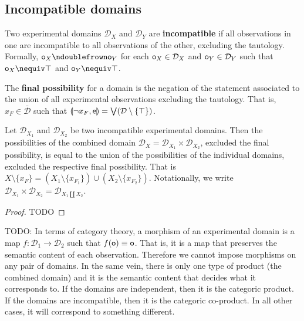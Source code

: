 \documentclass[11pt,letterpaper,fleqn]{memoir} %
\begin{document}
\subsection{Incompatible domains}

\begin{mathSection}
	\begin{defn}
		Two experimental domains $\mathcal{D}_X$ and $\mathcal{D}_Y$ are \textbf{incompatible} if all observations in one are incompatible to all observations of the other, excluding the tautology. Formally, $\obs_X \ncomp \obs_Y$ for each $\mathsf{o}_X \in \mathcal{D}_X$ and $\mathsf{o}_Y \in \mathcal{D}_Y$ such that $\obs_X \nequiv \tautology $ and $\obs_Y \nequiv \tautology$.
	\end{defn}
	\begin{defn}
		The \textbf{final possibility} for a domain is the negation of the statement associated to the union of all experimental observations excluding the tautology. That is, $x_F \in \bar{\mathcal{D}}$ such that $\llparenthesis \neg x_F, \mathsf{e} \rrparenthesis = \bigvee ( \mathcal{D} \setminus \{\top\})$.
	\end{defn}
	\begin{prop}
		Let $\mathcal{D}_{X_1}$ and $\mathcal{D}_{X_2}$ be two incompatible experimental domains. Then the possibilities of the combined domain $\mathcal{D}_X = \mathcal{D}_{X_1} \times \mathcal{D}_{X_2}$, excluded the final possibility, is equal to the union of the possibilities of the individual domains, excluded the respective final possibility. That is $X \setminus \{x_F\} = (X_1 \setminus \{x_{F_1}\}) \cup (X_2 \setminus \{x_{F_2}\})$. Notationally, we write $\mathcal{D}_{X_1} \times \mathcal{D}_{X_2} = \mathcal{D}_{X_1 \coprod X_2}$.
	\end{prop}
	\begin{proof}
		TODO
	\end{proof}
\end{mathSection}

TODO: In terms of category theory, a morphism of an experimental domain is a map $f : \mathcal{D}_1 \to \mathcal{D}_2$ such that $f(\mathsf{o}) \equiv \mathsf{o}$. That is, it is a map that preserves the semantic content of each observation. Therefore we cannot impose morphisms on any pair of domains. In the same vein, there is only one type of product (the combined domain) and it is the semantic content that decides what it corresponds to. If the domains are independent, then it is the categoric product. If the domains are incompatible, then it is the categoric co-product. In all other cases, it will correspond to something different.
\end{document}
